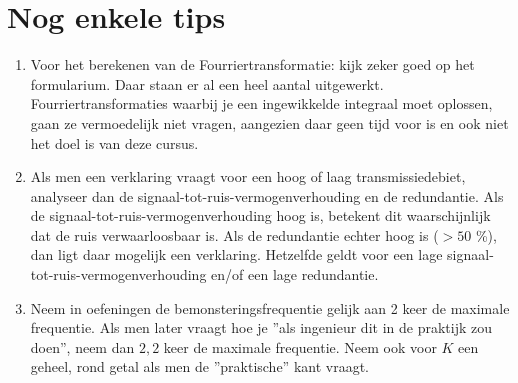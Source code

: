 \documentclass[12pt,a4paper]{article}
\begin{document}
\section*{Nog enkele tips}
\begin{enumerate}
\item Voor het berekenen van de Fourriertransformatie: kijk zeker goed op het formularium. Daar staan er al een heel aantal uitgewerkt. Fourriertransformaties waarbij je een ingewikkelde integraal moet oplossen, gaan ze vermoedelijk niet vragen, aangezien daar geen tijd voor is en ook niet het doel is van deze cursus.

\item Als men een verklaring vraagt voor een hoog of laag transmissiedebiet, analyseer dan de signaal-tot-ruis-vermogenverhouding en de redundantie. Als de signaal-tot-ruis-vermogenverhouding hoog is, betekent dit waarschijnlijk dat de ruis verwaarloosbaar is. Als de redundantie echter hoog is ($>50$ \%), dan ligt daar mogelijk een verklaring. Hetzelfde geldt voor een lage signaal-tot-ruis-vermogenverhouding en/of een lage redundantie.

\item Neem in oefeningen de bemonsteringsfrequentie gelijk aan 2 keer de maximale frequentie. Als men later vraagt hoe je ''als ingenieur dit in de praktijk zou doen'', neem dan $2,2$ keer de maximale frequentie. Neem ook voor $K$ een geheel, rond getal als men de ''praktische'' kant vraagt.
\end{enumerate}
\end{document}
